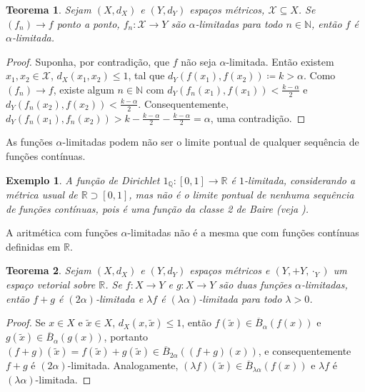 \documentclass[a4paper,12pt]{article}
\newtheorem{theorem}{Teorema}
\newtheorem{example}{Exemplo}
\theoremstyle{definition}
\begin{document}
\begin{theorem} Sejam $(X, d_X)$ e $(Y, d_Y)$ espaços métricos, $\mathcal{X} \subseteq X$. Se $(f_n) \to f$ ponto a ponto, $f_n : \mathcal{X} \to Y$ são $\alpha$-limitadas para todo $n \in \mathbb{N}$, então $f$ é $\alpha$-limitada. \end{theorem} \begin{proof} Suponha, por contradição, que $f$ não seja $\alpha$-limitada. Então existem $x_1, x_2 \in \mathcal{X}$, $d_X(x_1, x_2) \le 1$, tal que $d_Y(f(x_1), f(x_2)) \coloneqq k > \alpha$. Como $(f_n) \to f$, existe algum $n \in \mathbb{N}$ com $d_Y(f_n(x_1), f(x_1)) < \frac{k - \alpha}{2}$ e $d_Y(f_n(x_2), f(x_2)) < \frac{k - \alpha}{2}$. Consequentemente, $d_Y(f_n(x_1), f_n(x_2)) > k - \frac{k - \alpha}{2} - \frac{k - \alpha}{2} = \alpha$, uma contradição. \end{proof}

As funções $\alpha$-limitadas podem não ser o limite pontual de qualquer sequência de funções contínuas.

\begin{example} A função de Dirichlet $1_\mathbb{Q} : [0, 1] \to \mathbb{R}$ é $1$-limitada, considerando a métrica usual de $\mathbb{R} \supset [0, 1]$, mas não é o limite pontual de nenhuma sequência de funções contínuas, pois é uma função da classe 2 de Baire (veja \cite{baire}). \end{example}

A aritmética com funções $\alpha$-limitadas não é a mesma que com funções contínuas definidas em $\mathbb{R}$.

\begin{theorem} Sejam $(X, d_X)$ e $(Y, d_Y)$ espaços métricos e $(Y, +Y, \cdot_Y)$ um espaço vetorial sobre $\mathbb{R}$. Se $f : X \to Y$ e $g : X \to Y$ são duas funções $\alpha$-limitadas, então $f + g$ é $(2\alpha)$-limitada e $\lambda f$ é $(\lambda \alpha)$-limitada para todo $\lambda > 0$. \end{theorem} \begin{proof} Se $x \in X$ e $\tilde{x} \in X$, $d_X(x, \tilde{x}) \le 1$, então $f(\tilde{x}) \in \overline{B}_{\alpha}(f(x))$ e $g(\tilde{x}) \in \overline{B}_{\alpha}(g(x))$, portanto $(f + g)(\tilde{x}) = f(\tilde{x}) + g(\tilde{x}) \in \overline{B}_{2\alpha}((f + g)(x))$, e consequentemente $f + g$ é $(2\alpha)$-limitada. Analogamente, $(\lambda f)(\tilde{x}) \in \overline{B}_{\lambda \alpha}(f(x))$ e $\lambda f$ é $(\lambda \alpha)$-limitada. \end{proof}
\end{document}
